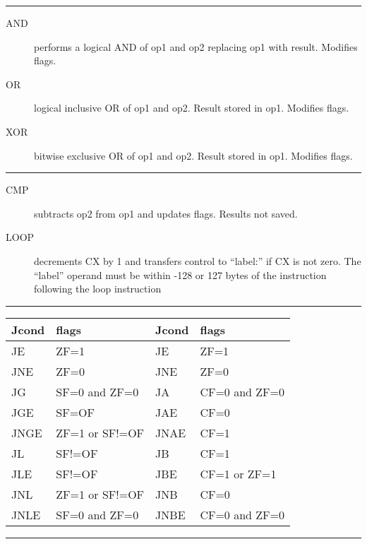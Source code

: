 \documentclass[10pt,landscape]{article}
\newcommand{\mysep}{\vspace{0.1cm}\hrule\vspace{0.1cm}}
\begin{document}
\begin{multicols*}{3}
\mysep

\begin{description}
  \item[AND] performs a logical AND of op1 and op2 replacing op1 with result.
    Modifies flags.
  \item[OR] logical inclusive OR of op1 and op2. Result stored in op1. Modifies
    flags.
  \item[XOR] bitwise exclusive OR of op1 and op2. Result stored in op1.
    Modifies flags.
\end{description}

\mysep

\begin{description}
  \item[CMP] subtracts op2 from op1 and updates flags. Results not saved.
  \item[LOOP] decrements CX by 1 and transfers control to ``label:'' if CX is
    not zero. The ``label'' operand must be within -128 or 127 bytes of the
    instruction following the loop instruction
\end{description}


\mysep

\begin{tabularx}{\linewidth}{|XXXX|} \hline

  Jcond & flags          & Jcond & flags \\ \hline
  JE    & ZF=1           & JE    & ZF=1 \\ \hline
  JNE   & ZF=0           & JNE   & ZF=0 \\ \hline
  JG    & SF=0 and ZF=0  & JA    & CF=0 and ZF=0 \\ \hline
  JGE   & SF=OF          & JAE   & CF=0 \\ \hline
  JNGE  & ZF=1 or SF!=OF & JNAE  & CF=1 \\ \hline
  JL    & SF!=OF         & JB    & CF=1 \\ \hline
  JLE   & SF!=OF         & JBE   & CF=1 or ZF=1 \\ \hline
  JNL   & ZF=1 or SF!=OF & JNB   & CF=0 \\ \hline
  JNLE  & SF=0 and ZF=0  & JNBE  & CF=0 and ZF=0\\ \hline

\end{tabularx}

\mysep


\end{multicols*}
\end{document}
